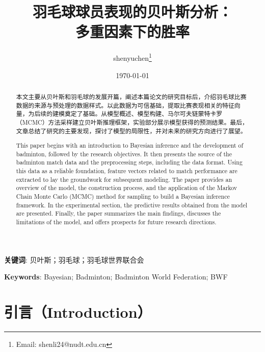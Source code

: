 \documentclass[12pt]{article}
\begin{document}
\title{羽毛球球员表现的贝叶斯分析：\\ 多重因素下的胜率}
\date{\today}

\author[1,2]{shenyuchen\thanks{Email: shenli24@nudt.edu.cn}}




\maketitle

\renewcommand{\abstractname}{摘要}
\begin{abstract}
	本文主要从贝叶斯和羽毛球的发展开篇，阐述本篇论文的研究目标后，介绍羽毛球比赛数据的来源与预处理的数据样式。以此数据为可信基础，提取比赛表现相关的特征向量，为后续的建模奠定了基础。从模型概述、模型构建、马尔可夫链蒙特卡罗（MCMC）方法采样建立贝叶斯推理框架，实验部分展示模型获得的预测结果。最后，文章总结了研究的主要发现，探讨了模型的局限性，并对未来的研究方向进行了展望。
\end{abstract}

\textbf{关键词}: 贝叶斯；羽毛球；羽毛球世界联合会

\renewcommand{\abstractname}{Abstract}
\begin{abstract}
	This paper begins with an introduction to Bayesian inference and the development of badminton, followed by the research objectives. It then presents the source of the badminton match data and the preprocessing steps, including the data format. Using this data as a reliable foundation, feature vectors related to match performance are extracted to lay the groundwork for subsequent modeling. The paper provides an overview of the model, the construction process, and the application of the Markov Chain Monte Carlo (MCMC) method for sampling to build a Bayesian inference framework. In the experimental section, the predictive results obtained from the model are presented. Finally, the paper summarizes the main findings, discusses the limitations of the model, and offers prospects for future research directions.
\end{abstract}

\textbf{Keywords}: Bayesian; Badminton; Badminton World Federation; BWF


\section{引言（Introduction）}
\end{document}
